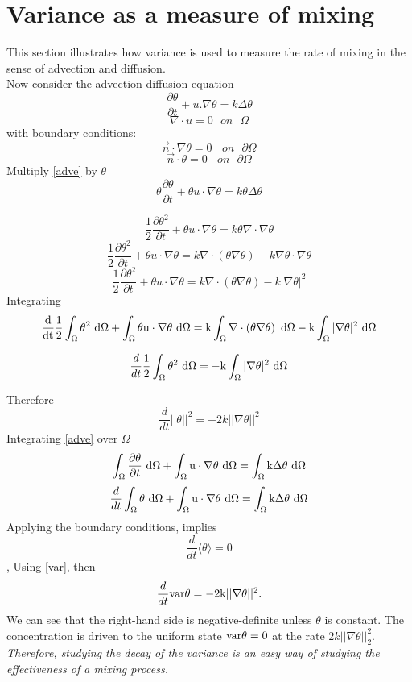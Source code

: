 \documentclass[12pt]{report}   %
\numberwithin{equation}{section}
\theoremstyle{plain}
\theoremstyle{definition}
\theoremstyle{remark}
\begin{document}
  \section{Variance as a measure of mixing}
  This section illustrates how variance is used to measure the rate of mixing in the sense of advection and diffusion. \\
  \vspace{0.02cm}
 Now consider the advection-diffusion equation
  \begin{equation}\label{adve}
  \frac{\partial\theta}{\partial t} + u.\nabla\theta = k\Delta\theta 
  \end{equation}
  \begin{equation}
   \nabla \cdot u = 0 ~~~on~~~ \Omega
  \end{equation}
  with boundary conditions:
  \begin{equation}
      \vec{n} \cdot \nabla\theta = 0 ~~~~on~~~\partial\Omega
  \end{equation}
     \begin{equation}
        \vec{n} \cdot \theta = 0 ~~~~on~~~\partial\Omega
    \end{equation}
  Multiply \eqref{adve} by $\theta$ 
  \[\theta \frac{\partial\theta}{\partial t} + \theta u\cdot\nabla\theta = k\theta\Delta\theta\]
  
  \[\frac{1}{2} \frac{\partial\theta^2}{\partial t} + \theta u\cdot\nabla\theta = k\theta\nabla\cdot\nabla\theta\]
  \[\frac{1}{2} \frac{\partial\theta^2}{\partial t} + \theta u\cdot\nabla\theta = k\nabla\cdot\left(\theta\nabla\theta\right)  - k\nabla\theta\cdot\nabla\theta\]
   \[\frac{1}{2} \frac{\partial\theta^2}{\partial t} + \theta u\cdot\nabla\theta = k\nabla\cdot\left(\theta\nabla\theta\right)  - k|\nabla\theta|^2\]
   Integrating
   \[\frac{\rm{d}}{\rm{d}t}\frac{1}{2}\int_{\Omega}\theta^2 ~\rm{d}\Omega + \int_{\Omega}\theta u\cdot\nabla\theta ~\rm{d}\Omega = k\int_{\Omega}\nabla\cdot\left(\theta\nabla\theta\right) ~\rm{d}\Omega - k\int_{\Omega} |\nabla\theta|^2 ~\rm{d}\Omega \]
   
   \[ \frac{d}{dt}\frac{1}{2}\int_{\Omega}\theta^2 ~\rm{d}\Omega = -k\int_{\Omega} |\nabla\theta|^2 ~\rm{d}\Omega \]
   
Therefore
\[ \frac{d}{dt}||\theta||^2 = -2k||\nabla\theta||^2 \]
Integrating \eqref{adve} over $\Omega$
\[\int_\Omega\frac{\partial \theta}{\partial t} ~\rm{d}\Omega + \int_\Omega u\cdot\nabla\theta ~\rm{d}\Omega= \int_\Omega k\Delta\theta ~\rm{d}\Omega \]
\[\frac{d}{dt} \int_\Omega\theta~ \rm{d}\Omega + \int_\Omega u\cdot\nabla\theta ~\rm{d}\Omega = \int_\Omega k\Delta\theta ~\rm{d}\Omega \]
Applying the boundary conditions, implies
  \[ \frac{d}{dt}\langle\theta\rangle= 0\] ,
 Using \eqref{var}, then 
 \begin{equation}\label{varder}
  \frac{d}{dt} \rm{var}\theta = -2k||\nabla\theta||^2 .
 \end{equation}
  We can see that the right-hand side is negative-definite unless $\theta$ is constant. The concentration is driven to the uniform state $\rm{var}\theta = 0$ at the rate $2k||\nabla\theta||_2^2$. \textit{Therefore, studying the decay of the variance is an easy way of studying the effectiveness of a mixing process.}
  
\end{document}
